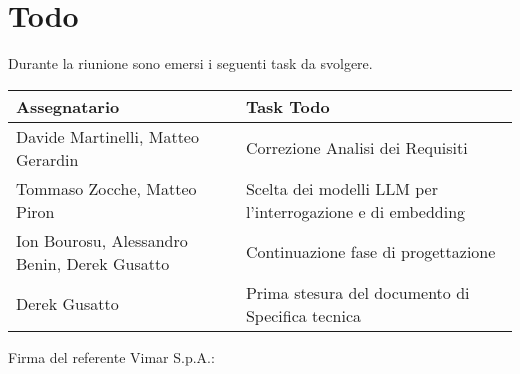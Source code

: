 \section{Todo}
Durante la riunione sono emersi i seguenti task da svolgere.

\begin{center}
  \begin{tabular}{|L{5cm}|L{8cm}|}
    \hline
    \textbf{Assegnatario} & \textbf{Task Todo} \\ \hline
      Davide Martinelli, Matteo Gerardin & Correzione Analisi dei Requisiti \\ \hline
      Tommaso Zocche, Matteo Piron & Scelta dei modelli LLM per l'interrogazione e di embedding \\ \hline
      Ion Bourosu, Alessandro Benin, Derek Gusatto & Continuazione fase di progettazione \\ \hline
      Derek Gusatto & Prima stesura del documento di Specifica tecnica \\ \hline
  \end{tabular}
\end{center}

\vspace{4cm}
\noindent Firma del referente Vimar S.p.A.: \underline{\hspace{5cm}}